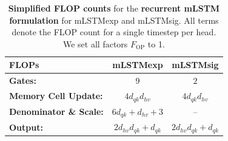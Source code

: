 \documentclass{article}
\begin{document}
    \begin{table}[htbp]
        \vspace{-0.3cm}
        \centering
        \caption{\label{tab:simpl_flop_counts_mlstm_recurrent} \textbf{Simplified FLOP counts} for the \textbf{recurrent mLSTM formulation} for mLSTMexp and mLSTMsig.
            All terms denote the FLOP count for a single timestep per head. We set all factors $F_\text{OP}$ to 1.}
        \vspace{0.2cm}
        \begin{tabular}{lcc}
            \toprule
            FLOPs                          & mLSTMexp                   & mLSTMsig                   \\
            \midrule
            \textbf{Gates:}                & $9 $                       & $2 $                       \\
            \textbf{Memory Cell Update:}   & $4 d_{qk} d_{hv}$          & $4 d_{qk} d_{hv}$          \\
            \textbf{Denominator \& Scale:} & $6 d_{qk} + d_{hv} + 3$    & --                         \\
            \textbf{Output:}               & $2 d_{hv} d_{qk} + d_{qk}$ & $2 d_{hv} d_{qk} + d_{qk}$ \\
            \bottomrule
        \end{tabular}
        \vspace{-0.2cm}
    \end{table}
\end{document}
